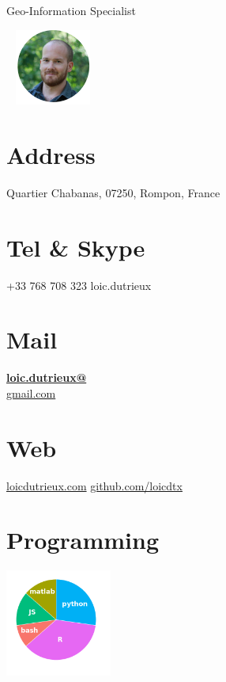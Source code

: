 \documentclass[]{friggeri-cv}
\begin{document}
      {Geo-Information Specialist}
      

\begin{aside}
    ~
    \includegraphics[width=2.5cm]{img/profile_circle_small.png}
    ~
  \section{Address}
    Quartier Chabanas,
    07250, Rompon, France
    ~
  \section{Tel \& Skype}
    +33 768 708 323
    loic.dutrieux
    ~
  \section{Mail}
    \href{mailto:loic.dutrieux@gmail.com}{\textbf{loic.dutrieux@}\\gmail.com}
    ~
  \section{Web}
    \href{http://www.loicdutrieux.com}{loicdutrieux.com}
    \href{https://github.com/loicdtx}{github.com/loicdtx}
    ~
  \section{Programming}
    \includegraphics[width=3.5cm]{img/programming.png}
    ~

\end{aside}
\end{document}
